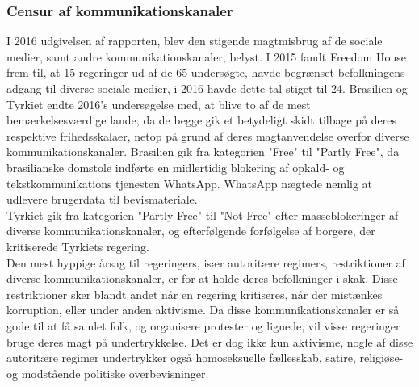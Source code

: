 \subsubsection{Censur af kommunikationskanaler}
I 2016 udgivelsen af rapporten, blev den stigende magtmisbrug af de sociale medier, samt andre kommunikationskanaler, belyst. I 2015 fandt Freedom House frem til, at 15 regeringer ud af de 65 undersøgte, havde begrænset befolkningens adgang til diverse sociale medier, i 2016 havde dette tal stiget til 24. Brasilien og Tyrkiet endte 2016's undersøgelse med, at blive to af de mest bemærkelsesværdige lande, da de begge gik et betydeligt skidt tilbage på deres respektive frihedsskalaer, netop på grund af deres magtanvendelse overfor diverse kommunikationskanaler. Brasilien gik fra kategorien "Free" til "Partly Free", da brasilianske domstole indførte en midlertidig blokering af opkald- og tekstkommunikations tjenesten WhatsApp. WhatsApp nægtede nemlig at udlevere brugerdata til bevismateriale.\\ 
Tyrkiet gik fra kategorien "Partly Free" til "Not Free" efter masseblokeringer af diverse kommunikationskanaler, og efterfølgende forfølgelse af borgere, der kritiserede Tyrkiets regering. \\
\noindent
Den mest hyppige årsag til regeringers, især autoritære regimers, restriktioner af diverse kommunikationskanaler, er for at holde deres befolkninger i skak. Disse restriktioner sker blandt andet når en regering kritiseres, når der mistænkes korruption, eller under anden aktivisme. Da disse kommunikationskanaler er så gode til at få samlet folk, og organisere protester og lignede, vil visse regeringer bruge deres magt på undertrykkelse. Det er dog ikke kun aktivisme, nogle af disse autoritære regimer undertrykker også homoseksuelle fællesskab, satire, religiøse- og modstående politiske overbevisninger.\cite{FreedomHouseRapport2016}
\newpage

